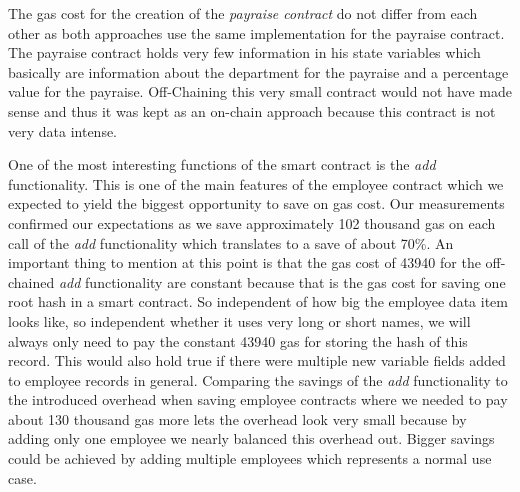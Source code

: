 The gas cost for the creation of the \textit{payraise contract} do not differ from each other as both approaches use the same implementation for the payraise contract. The payraise contract holds very few information in his state variables which basically are information about the department for the payraise and a percentage value for the payraise. Off-Chaining this very small contract would not have made sense and thus it was kept as an on-chain approach because this contract is not very data intense.

One of the most interesting functions of the smart contract is the \textit{add} functionality. This is one of the main features of the employee contract which we expected to yield the biggest opportunity to save on gas cost. Our measurements confirmed our expectations as we save approximately 102 thousand gas on each call of the \textit{add} functionality which translates to a save of about 70\%. An important thing to mention at this point is that the gas cost of 43940 for the off-chained \textit{add} functionality are constant because that is the gas cost for saving one root hash in a smart contract. So independent of how big the employee data item looks like, so independent whether it uses very long or short names, we will always only need to pay the constant 43940 gas for storing the hash of this record. This would also hold true if there were multiple new variable fields added to employee records in general. Comparing the savings of the \textit{add} functionality to the introduced overhead when saving employee contracts where we needed to pay about 130 thousand gas more lets the overhead look very small because by adding only one employee we nearly balanced this overhead out. Bigger savings could be achieved by adding multiple employees which represents a normal use case.

